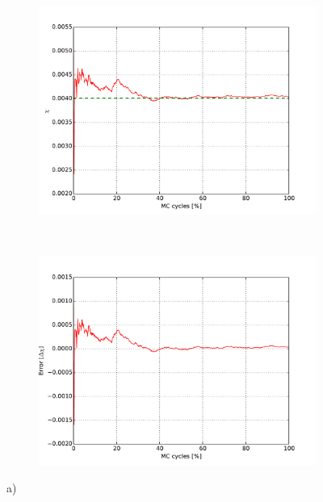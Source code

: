 \begin{figure}[H]
    \centering
    \begin{subfigure}{0.5\textwidth}
        \centering
        \includegraphics[width=\linewidth]{result/bilder/2x2/chi22}
        \caption{}
    \end{subfigure}%
    ~ 
    \begin{subfigure}{0.5\textwidth}
        \centering
        \includegraphics[width=\linewidth]{result/bilder/2x2/chierror22}
        \caption{}
    \end{subfigure}
    \caption{a) }
    \label{fig:22-energy}
\end{figure}





